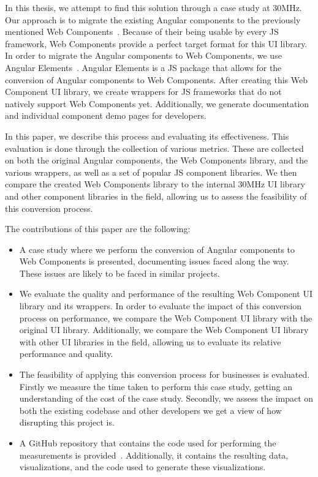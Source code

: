 In this thesis, we attempt to find this solution through a case study at 30MHz. Our approach is to migrate the existing Angular components to the previously mentioned Web Components~. Because of their being usable by every JS framework, Web Components provide a perfect target format for this UI library. In order to migrate the Angular components to Web Components, we use Angular Elements~. Angular Elements is a JS package that allows for the conversion of Angular components to Web Components. After creating this Web Component UI library, we create wrappers for JS frameworks that do not natively support Web Components yet. Additionally, we generate documentation and individual component demo pages for developers.

In this paper, we describe this process and evaluating its effectiveness. This evaluation is done through the collection of various metrics. These are collected on both the original Angular components, the Web Components library, and the various wrappers, as well as a set of popular JS component libraries. We then compare the created Web Components library to the internal 30MHz UI library and other component libraries in the field, allowing us to assess the feasibility of this conversion process.

The contributions of this paper are the following:

\begin{itemize}
	\item A case study where we perform the conversion of Angular components to Web Components is presented, documenting issues faced along the way. These issues are likely to be faced in similar projects.
	\item We evaluate the quality and performance of the resulting Web Component UI library and its wrappers. In order to evaluate the impact of this conversion process on performance, we compare the Web Component UI library with the original UI library. Additionally, we compare the Web Component UI library with other UI libraries in the field, allowing us to evaluate its relative performance and quality.
	\item The feasibility of applying this conversion process for businesses is evaluated. Firstly we measure the time taken to perform this case study, getting an understanding of the cost of the case study. Secondly, we assess the impact on both the existing codebase and other developers we get a view of how disrupting this project is.
	\item A GitHub repository that contains the code used for performing the measurements is provided~. Additionally, it contains the resulting data, visualizations, and the code used to generate these visualizations.
\end{itemize}